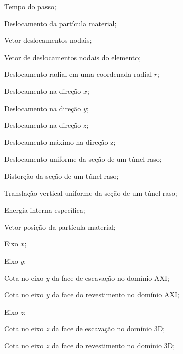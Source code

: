 \item[$ t_p $] 			Tempo do passo;
\item[$ \ul $] 		    Deslocamento da partícula material;
\item[$ \ul $] 		    Vetor deslocamentos nodais;
\item[$ \ul_e $] 		    Vetor de deslocamentos nodais do elemento;
\item[$ u(r) $] 		Deslocamento radial em uma coordenada radial $r$;
\item[$ u_x $] 			Deslocamento na direção $x$;
\item[$ u_y $] 			Deslocamento na direção $y$;
\item[$ u_z $] 			Deslocamento na direção $z$;
\item[$ u_{z_{max}} $] 	Deslocamento máximo na direção z;
\item[$ u_\varepsilon $] Deslocamento uniforme da seção de um túnel raso;
\item[$ u_\delta $] 	 Distorção da seção de um túnel raso;
\item[$ \Delta u_y $] 	 Translação vertical uniforme da seção de um túnel raso;
\item[$ w $] 	 		Energia interna específica;
\item[$\xl$]			Vetor posição da partícula material;
\item[$x$]				Eixo $x$;
\item[$y$]				Eixo $y$;
\item[$y_f$]			Cota no eixo $y$ da face de escavação no domínio AXI;
\item[$y_r$]			Cota no eixo $y$ da face do revestimento no domínio AXI;
\item[$z$]				Eixo $z$;
\item[$z_f$]			Cota no eixo $z$ da face de escavação no domínio 3D;
\item[$z_r$]			Cota no eixo $z$ da face do revestimento no domínio 3D;

